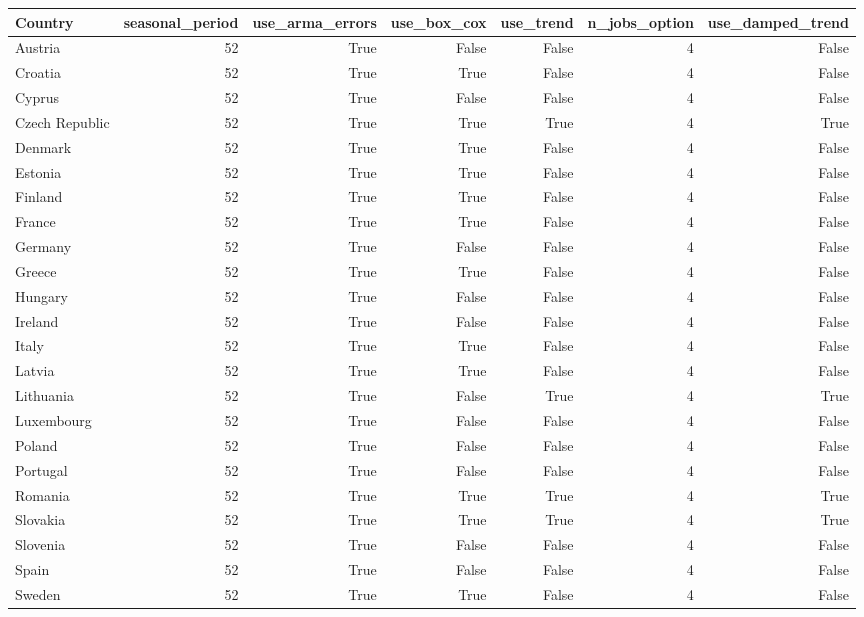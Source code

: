 \begin{tabular}{lrrrrrr}
\toprule
Country & seasonal\_period & use\_arma\_errors & use\_box\_cox & use\_trend & n\_jobs\_option & use\_damped\_trend \\
\midrule
Austria & 52 & True & False & False & 4 & False \\
Croatia & 52 & True & True & False & 4 & False \\
Cyprus & 52 & True & False & False & 4 & False \\
Czech Republic & 52 & True & True & True & 4 & True \\
Denmark & 52 & True & True & False & 4 & False \\
Estonia & 52 & True & True & False & 4 & False \\
Finland & 52 & True & True & False & 4 & False \\
France & 52 & True & True & False & 4 & False \\
Germany & 52 & True & False & False & 4 & False \\
Greece & 52 & True & True & False & 4 & False \\
Hungary & 52 & True & False & False & 4 & False \\
Ireland & 52 & True & False & False & 4 & False \\
Italy & 52 & True & True & False & 4 & False \\
Latvia & 52 & True & True & False & 4 & False \\
Lithuania & 52 & True & False & True & 4 & True \\
Luxembourg & 52 & True & False & False & 4 & False \\
Poland & 52 & True & False & False & 4 & False \\
Portugal & 52 & True & False & False & 4 & False \\
Romania & 52 & True & True & True & 4 & True \\
Slovakia & 52 & True & True & True & 4 & True \\
Slovenia & 52 & True & False & False & 4 & False \\
Spain & 52 & True & False & False & 4 & False \\
Sweden & 52 & True & True & False & 4 & False \\
\bottomrule
\end{tabular}
